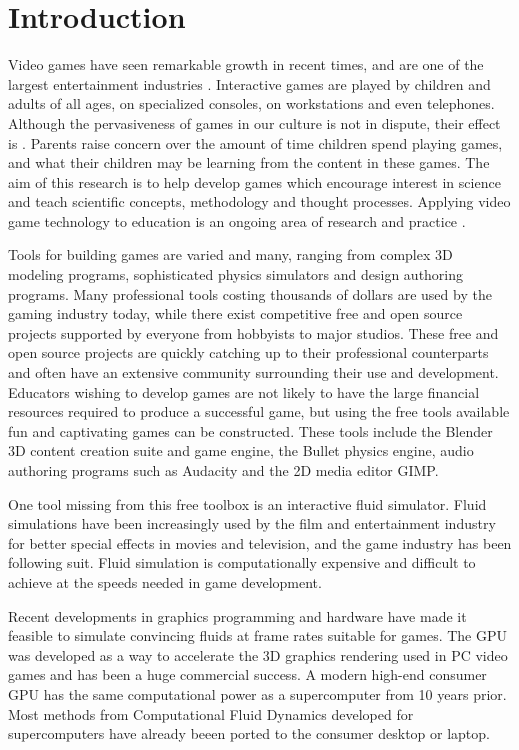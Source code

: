 \chapter{Introduction}
\label{chapter:introduction}

Video games have seen remarkable growth in recent times, and are one of the
largest entertainment industries \cite{Kafai2006}. Interactive games are played by
children and adults of all ages, on specialized consoles, on workstations and
even telephones. Although the pervasiveness of games in our culture is not in dispute,
their effect is \cite{Ferguson2007}. Parents raise concern over the amount of time
children spend playing games, and what their children may be learning from the
content in these games. The aim of this research is to help develop games which
encourage interest in science and teach scientific concepts, methodology and
thought processes. Applying video game technology to education is an ongoing
area of research and practice \cite{Hayes2008}. 

Tools for building games are varied and many, ranging from complex 3D modeling
programs, sophisticated physics simulators and design authoring programs. Many
professional tools costing thousands of dollars are used by the gaming industry
today, while there exist competitive free and open source projects supported by
everyone from hobbyists to major studios. These free and open source projects
are quickly catching up to their professional counterparts and often have an
extensive community surrounding their use and development. Educators wishing to
develop games are not likely to have the large financial resources required to
produce a successful game, but using the free tools available fun and
captivating games can be constructed. These tools include the Blender 3D
content creation suite and game engine, the Bullet physics engine, audio
authoring programs such as Audacity and the 2D media editor GIMP. 


One tool missing from this free toolbox is an interactive fluid simulator.
Fluid simulations have been increasingly used by the film and entertainment
industry for better special effects in movies and television, and the game
industry has been following suit. Fluid simulation is computationally expensive
and difficult to achieve at the speeds needed in game development. 

Recent developments in graphics programming and hardware have made it feasible
to simulate convincing fluids at frame rates suitable for games. The GPU was
developed as a way to accelerate the 3D graphics rendering used in PC video
games and has been a huge commercial success. A modern high-end consumer GPU
has the same computational power as a supercomputer from 10 years prior.
Most methods from Computational Fluid Dynamics developed for supercomputers
have already beeen ported to the consumer desktop or laptop.


